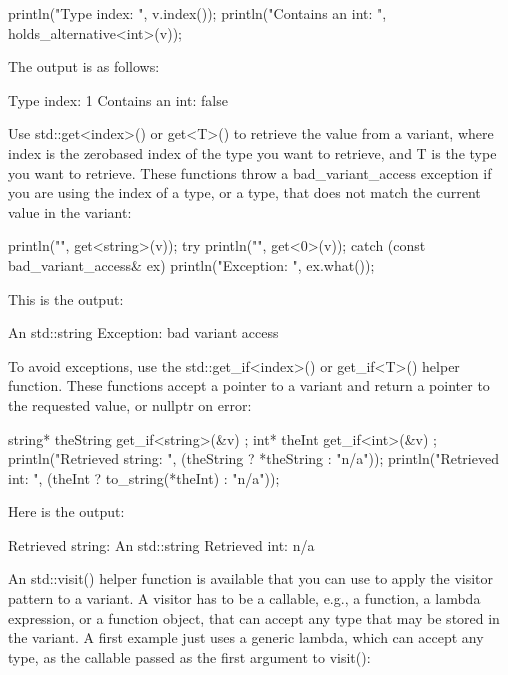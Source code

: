 \begin{cpp}
println("Type index: {}", v.index());
println("Contains an int: {}", holds_alternative<int>(v));
\end{cpp}

The output is as follows:

\begin{shell}
Type index: 1
Contains an int: false
\end{shell}

Use std::get<index>() or get<T>() to retrieve the value from a variant, where index is the zerobased index of the type you want to retrieve, and T is the type you want to retrieve. These functions throw a bad\_variant\_access exception if you are using the index of a type, or a type, that does not match the current value in the variant:

\begin{cpp}
println("{}", get<string>(v));
try {
    println("{}", get<0>(v));
} catch (const bad_variant_access& ex) {
    println("Exception: {}", ex.what());
}
\end{cpp}

This is the output:

\begin{shell}
An std::string
Exception: bad variant access
\end{shell}

To avoid exceptions, use the std::get\_if<index>() or get\_if<T>() helper function. These functions accept a pointer to a variant and return a pointer to the requested value, or nullptr on error:

\begin{cpp}
string* theString { get_if<string>(&v) };
int* theInt { get_if<int>(&v) };
println("Retrieved string: {}", (theString ? *theString : "n/a"));
println("Retrieved int: {}", (theInt ? to_string(*theInt) : "n/a"));
\end{cpp}

Here is the output:

\begin{shell}
Retrieved string: An std::string
Retrieved int: n/a
\end{shell}

An std::visit() helper function is available that you can use to apply the visitor pattern to a variant. A visitor has to be a callable, e.g., a function, a lambda expression, or a function object, that can accept any type that may be stored in the variant. A first example just uses a generic lambda, which can accept any type, as the callable passed as the first argument to visit():

